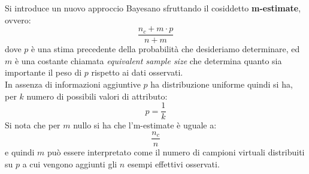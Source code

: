 \documentclass[a4paper,12pt, oneside]{book}
\begin{document}
Si introduce un nuovo approccio Bayesano sfruttando il cosiddetto
\textbf{m-estimate}, ovvero: 
\[\frac{n_c+m\cdot p}{n+m}\]
dove $p$ è una stima precedente della probabilità che desideriamo determinare,
ed $m$ è una costante chiamata \textit{equivalent sample size} che determina
quanto sia importante il peso di $p$ rispetto ai dati osservati.\\
In assenza di informazioni aggiuntive $p$ ha distribuzione uniforme quindi si
ha, per $k$ numero di possibili valori di attributo:
\[p=\frac{1}{k}\]
Si nota che per $m$ nullo si ha che l'm-estimate è uguale a:
\[\frac{n_c}{n}\]
e quindi $m$ può essere interpretato come il numero di campioni virtuali
distribuiti su $p$ a cui vengono aggiunti gli $n$ esempi effettivi osservati.\\
\end{document}
